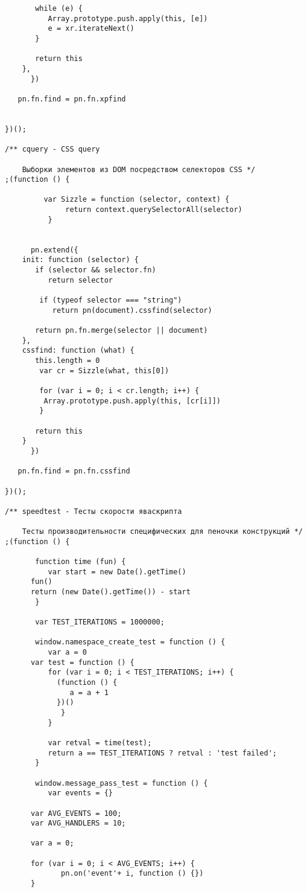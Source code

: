 \documentclass[a4papre,12pt]{article}
\begin{document}
\begin{verbatim}
	   while (e) {
	      Array.prototype.push.apply(this, [e])
	      e = xr.iterateNext()
	   }

	   return this
	},	
      })

   pn.fn.find = pn.fn.xpfind
		 
   
})();

/** cquery - CSS query

    Выборки элементов из DOM посредством селекторов CSS */
;(function () {

	     var Sizzle = function (selector, context) {
			  return context.querySelectorAll(selector)
		  }
	  

      pn.extend({
	init: function (selector) {
	   if (selector && selector.fn) 
	      return selector

	    if (typeof selector === "string") 
	       return pn(document).cssfind(selector)

	   return pn.fn.merge(selector || document)
	},
	cssfind: function (what) {
	   this.length = 0
		var cr = Sizzle(what, this[0])
		
		for (var i = 0; i < cr.length; i++) {
	   	 Array.prototype.push.apply(this, [cr[i]])
		}

	   return this
	}	
      })

   pn.fn.find = pn.fn.cssfind 
   
})();

/** speedtest - Тесты скорости яваскрипта

    Тесты производительности специфических для пеночки конструкций */
;(function () {

       function time (fun) {
          var start = new Date().getTime()
   	  fun()
   	  return (new Date().getTime()) - start
       }

       var TEST_ITERATIONS = 1000000;

       window.namespace_create_test = function () {
       	  var a = 0
   	  var test = function () {
      	  for (var i = 0; i < TEST_ITERATIONS; i++) {
	        (function () {
	     	   a = a + 1
	        })()
      	     } 
       	  }

       	  var retval = time(test);
       	  return a == TEST_ITERATIONS ? retval : 'test failed';
       }

       window.message_pass_test = function () {
          var events = {}

   	  var AVG_EVENTS = 100;
   	  var AVG_HANDLERS = 10;

   	  var a = 0;

   	  for (var i = 0; i < AVG_EVENTS; i++) {
      	     pn.on('event'+ i, function () {})
   	  }
   

\end{verbatim}
\end{document}

